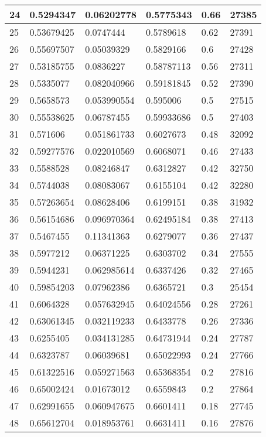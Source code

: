 \begin{longtable}{|l|l|l|l|l|l|}
24 & 0.5294347 & 0.06202778 & 0.5775343 & 0.66 & 27385 \\ \hline 
25 & 0.53679425 & 0.0747444 & 0.5789618 & 0.62 & 27391 \\ \hline 
26 & 0.55697507 & 0.05039329 & 0.5829166 & 0.6 & 27428 \\ \hline 
27 & 0.53185755 & 0.0836227 & 0.58787113 & 0.56 & 27311 \\ \hline 
28 & 0.5335077 & 0.082040966 & 0.59181845 & 0.52 & 27390 \\ \hline 
29 & 0.5658573 & 0.053990554 & 0.595006 & 0.5 & 27515 \\ \hline 
30 & 0.55538625 & 0.06787455 & 0.59933686 & 0.5 & 27403 \\ \hline 
31 & 0.571606 & 0.051861733 & 0.6027673 & 0.48 & 32092 \\ \hline 
32 & 0.59277576 & 0.022010569 & 0.6068071 & 0.46 & 27433 \\ \hline 
33 & 0.5588528 & 0.08246847 & 0.6312827 & 0.42 & 32750 \\ \hline 
34 & 0.5744038 & 0.08083067 & 0.6155104 & 0.42 & 32280 \\ \hline 
35 & 0.57263654 & 0.08628406 & 0.6199151 & 0.38 & 31932 \\ \hline 
36 & 0.56154686 & 0.096970364 & 0.62495184 & 0.38 & 27413 \\ \hline 
37 & 0.5467455 & 0.11341363 & 0.6279077 & 0.36 & 27437 \\ \hline 
38 & 0.5977212 & 0.06371225 & 0.6303702 & 0.34 & 27555 \\ \hline 
39 & 0.5944231 & 0.062985614 & 0.6337426 & 0.32 & 27465 \\ \hline 
40 & 0.59854203 & 0.07962386 & 0.6365721 & 0.3 & 25454 \\ \hline 
41 & 0.6064328 & 0.057632945 & 0.64024556 & 0.28 & 27261 \\ \hline 
42 & 0.63061345 & 0.032119233 & 0.6433778 & 0.26 & 27336 \\ \hline 
43 & 0.6255405 & 0.034131285 & 0.64731944 & 0.24 & 27787 \\ \hline 
44 & 0.6323787 & 0.06039681 & 0.65022993 & 0.24 & 27766 \\ \hline 
45 & 0.61322516 & 0.059271563 & 0.65368354 & 0.2 & 27816 \\ \hline 
46 & 0.65002424 & 0.01673012 & 0.6559843 & 0.2 & 27864 \\ \hline 
47 & 0.62991655 & 0.060947675 & 0.6601411 & 0.18 & 27745 \\ \hline 
48 & 0.65612704 & 0.018953761 & 0.6631411 & 0.16 & 27876 \\ \hline 

\end{longtable}
